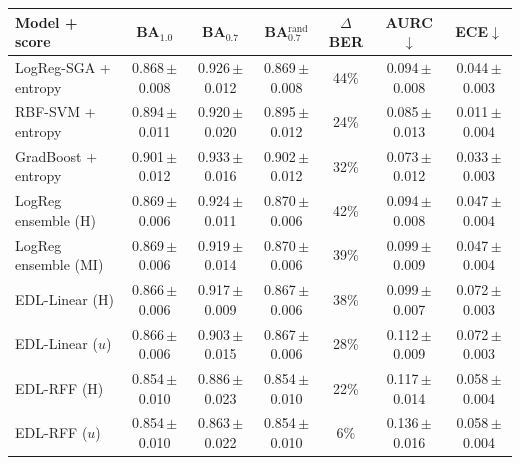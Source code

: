\begin{tabular}{lcccccc}\toprule
Model + score & BA$_{1.0}$ & BA$_{0.7}$ & BA$_{0.7}^{\text{rand}}$ & $\Delta$BER & AURC$\downarrow$ & ECE$\downarrow$\\\midrule
LogReg-SGA + entropy & 0.868\,{\scriptsize$\pm$0.008} & 0.926\,{\scriptsize$\pm$0.012} & 0.869\,{\scriptsize$\pm$0.008} & 44\% & 0.094\,{\scriptsize$\pm$0.008} & 0.044\,{\scriptsize$\pm$0.003}\\
RBF-SVM + entropy & 0.894\,{\scriptsize$\pm$0.011} & 0.920\,{\scriptsize$\pm$0.020} & 0.895\,{\scriptsize$\pm$0.012} & 24\% & 0.085\,{\scriptsize$\pm$0.013} & 0.011\,{\scriptsize$\pm$0.004}\\
GradBoost + entropy & 0.901\,{\scriptsize$\pm$0.012} & 0.933\,{\scriptsize$\pm$0.016} & 0.902\,{\scriptsize$\pm$0.012} & 32\% & 0.073\,{\scriptsize$\pm$0.012} & 0.033\,{\scriptsize$\pm$0.003}\\
LogReg ensemble (H) & 0.869\,{\scriptsize$\pm$0.006} & 0.924\,{\scriptsize$\pm$0.011} & 0.870\,{\scriptsize$\pm$0.006} & 42\% & 0.094\,{\scriptsize$\pm$0.008} & 0.047\,{\scriptsize$\pm$0.004}\\
LogReg ensemble (MI) & 0.869\,{\scriptsize$\pm$0.006} & 0.919\,{\scriptsize$\pm$0.014} & 0.870\,{\scriptsize$\pm$0.006} & 39\% & 0.099\,{\scriptsize$\pm$0.009} & 0.047\,{\scriptsize$\pm$0.004}\\
EDL-Linear (H) & 0.866\,{\scriptsize$\pm$0.006} & 0.917\,{\scriptsize$\pm$0.009} & 0.867\,{\scriptsize$\pm$0.006} & 38\% & 0.099\,{\scriptsize$\pm$0.007} & 0.072\,{\scriptsize$\pm$0.003}\\
EDL-Linear ($u$) & 0.866\,{\scriptsize$\pm$0.006} & 0.903\,{\scriptsize$\pm$0.015} & 0.867\,{\scriptsize$\pm$0.006} & 28\% & 0.112\,{\scriptsize$\pm$0.009} & 0.072\,{\scriptsize$\pm$0.003}\\
EDL-RFF (H) & 0.854\,{\scriptsize$\pm$0.010} & 0.886\,{\scriptsize$\pm$0.023} & 0.854\,{\scriptsize$\pm$0.010} & 22\% & 0.117\,{\scriptsize$\pm$0.014} & 0.058\,{\scriptsize$\pm$0.004}\\
EDL-RFF ($u$) & 0.854\,{\scriptsize$\pm$0.010} & 0.863\,{\scriptsize$\pm$0.022} & 0.854\,{\scriptsize$\pm$0.010} & 6\% & 0.136\,{\scriptsize$\pm$0.016} & 0.058\,{\scriptsize$\pm$0.004}\\
\bottomrule\end{tabular}